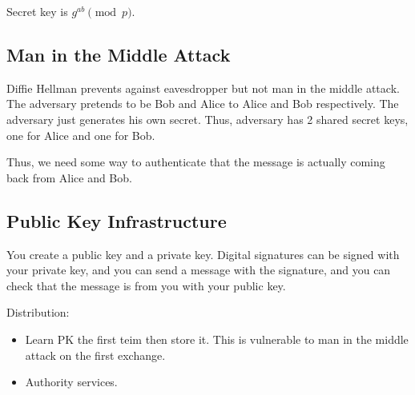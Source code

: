 \documentclass[psamsfonts]{amsart}
\begin{document}
Secret key is $g^{ab} \pmod{p}$. 

\subsection{Man in the Middle Attack}

Diffie Hellman prevents against eavesdropper but not man in the middle attack. The adversary pretends to be Bob and Alice to Alice and Bob respectively. The adversary just generates his own secret. Thus, adversary has 2 shared secret keys, one for Alice and one for Bob.

Thus, we need some way to authenticate that the message is actually coming back from Alice and Bob.

\subsection{Public Key Infrastructure}

You create a public key and a private key. Digital signatures can be signed with your private key, and you can send a message with the signature, and you can check that the message is from you with your public key.

Distribution:
\begin{itemize}
  \item Learn PK the first teim then store it. This is vulnerable to man in the middle attack on the first exchange.
  \item Authority services.
\end{itemize}
\end{document}
